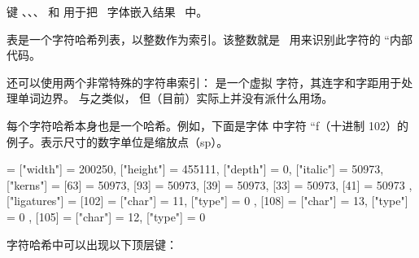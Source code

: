 键 、、、 和
 用于把 \OPENTYPE\ 字体嵌入结果 \PDF\ 中。

 表是一个字符哈希列表，以整数作为索引。该整数就是
\TEX\ 用来识别此字符的 ``内部代码。

还可以使用两个非常特殊的字符串索引： 是一个虚拟
字符，其连字和字距用于处理单词边界。 与之类似，
但（目前）实际上并没有派什么用场。

每个字符哈希本身也是一个哈希。例如，下面是字体 
中字符 ``f（十进制 102）的例子。表示尺寸的数字单位是缩放点（sp）。

\begin{typing}
[102] = {
    ["width"]  = 200250,
    ["height"] = 455111,
    ["depth"]  = 0,
    ["italic"] = 50973,
    ["kerns"]  = {
        [63] = 50973,
        [93] = 50973,
        [39] = 50973,
        [33] = 50973,
        [41] = 50973
    },
    ["ligatures"] = {
        [102] = { ["char"] = 11, ["type"] = 0 },
        [108] = { ["char"] = 13, ["type"] = 0 },
        [105] = { ["char"] = 12, ["type"] = 0 }
    }
}
\end{typing}

字符哈希中可以出现以下顶层键：

